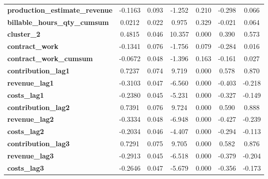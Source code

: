 \begin{center}
\begin{tabular}{lcccccc}
\textbf{production\_estimate\_revenue} &      -0.1163  &        0.093     &    -1.252  &         0.210        &       -0.298    &        0.066     \\
\textbf{billable\_hours\_qty\_cumsum}  &       0.0212  &        0.022     &     0.975  &         0.329        &       -0.021    &        0.064     \\
\textbf{cluster\_2}                    &       0.4815  &        0.046     &    10.357  &         0.000        &        0.390    &        0.573     \\
\textbf{contract\_work}                &      -0.1341  &        0.076     &    -1.756  &         0.079        &       -0.284    &        0.016     \\
\textbf{contract\_work\_cumsum}        &      -0.0672  &        0.048     &    -1.396  &         0.163        &       -0.161    &        0.027     \\
\textbf{contribution\_lag1}            &       0.7237  &        0.074     &     9.719  &         0.000        &        0.578    &        0.870     \\
\textbf{revenue\_lag1}                 &      -0.3103  &        0.047     &    -6.560  &         0.000        &       -0.403    &       -0.218     \\
\textbf{costs\_lag1}                   &      -0.2380  &        0.045     &    -5.231  &         0.000        &       -0.327    &       -0.149     \\
\textbf{contribution\_lag2}            &       0.7391  &        0.076     &     9.724  &         0.000        &        0.590    &        0.888     \\
\textbf{revenue\_lag2}                 &      -0.3334  &        0.048     &    -6.948  &         0.000        &       -0.427    &       -0.239     \\
\textbf{costs\_lag2}                   &      -0.2034  &        0.046     &    -4.407  &         0.000        &       -0.294    &       -0.113     \\
\textbf{contribution\_lag3}            &       0.7291  &        0.075     &     9.705  &         0.000        &        0.582    &        0.876     \\
\textbf{revenue\_lag3}                 &      -0.2913  &        0.045     &    -6.518  &         0.000        &       -0.379    &       -0.204     \\
\textbf{costs\_lag3}                   &      -0.2646  &        0.047     &    -5.679  &         0.000        &       -0.356    &       -0.173     \\

\end{tabular}
\end{center}
